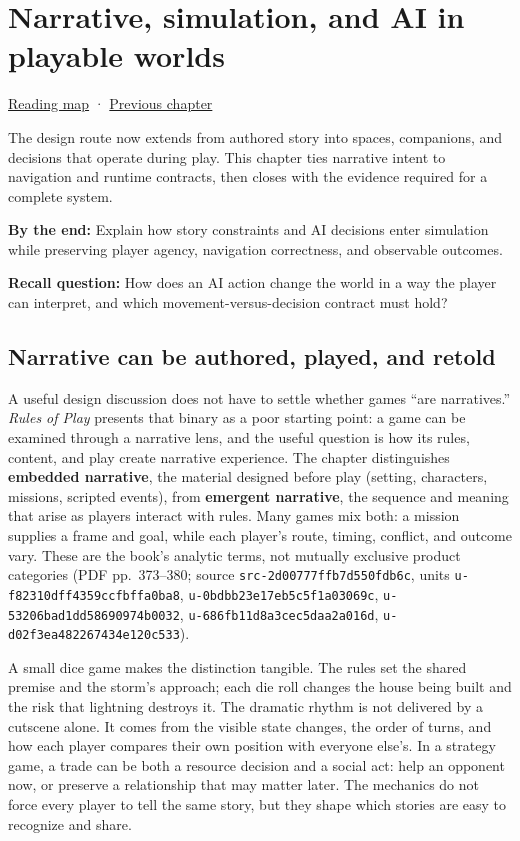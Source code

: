 \hypertarget{06-engine-ii-ch047}{}
\chapter{Narrative, simulation, and AI in playable worlds}\label{06-engine-ii-ch047-narrative-simulation-and-ai-in-playable-worlds}

\hyperref[volume-reading-map]{Reading map} · \hyperref[06-engine-ii-ch046-game-design-from-mechanics-to-narrative-interfaces]{Previous chapter}

The design route now extends from authored story into spaces, companions, and decisions that operate during play. This chapter ties narrative intent to navigation and runtime contracts, then closes with the evidence required for a complete system.

\textbf{By the end:} Explain how story constraints and AI decisions enter simulation while preserving player agency, navigation correctness, and observable outcomes.

\textbf{Recall question:} How does an AI action change the world in a way the player can interpret, and which movement-versus-decision contract must hold?

\section{Narrative can be authored, played, and retold}\label{06-engine-ii-ch047-narrative-can-be-authored-played-and-retold}

A useful design discussion does not have to settle whether games ``are narratives.'' \emph{Rules of Play} presents that binary as a poor starting point: a game can be examined through a narrative lens, and the useful question is how its rules, content, and play create narrative experience. The chapter distinguishes \textbf{embedded narrative}, the material designed before play (setting, characters, missions, scripted events), from \textbf{emergent narrative}, the sequence and meaning that arise as players interact with rules. Many games mix both: a mission supplies a frame and goal, while each player's route, timing, conflict, and outcome vary. These are the book's analytic terms, not mutually exclusive product categories (PDF pp.~373--380; source \texttt{src-2d00777ffb7d550fdb6c}, units \texttt{u-f82310dff4359ccfbffa0ba8}, \texttt{u-0bdbb23e17eb5c5f1a03069c}, \texttt{u-53206bad1dd58690974b0032}, \texttt{u-686fb11d8a3cec5daa2a016d}, \texttt{u-d02f3ea482267434e120c533}).

A small dice game makes the distinction tangible. The rules set the shared premise and the storm's approach; each die roll changes the house being built and the risk that lightning destroys it. The dramatic rhythm is not delivered by a cutscene alone. It comes from the visible state changes, the order of turns, and how each player compares their own position with everyone else's. In a strategy game, a trade can be both a resource decision and a social act: help an opponent now, or preserve a relationship that may matter later. The mechanics do not force every player to tell the same story, but they shape which stories are easy to recognize and share.

